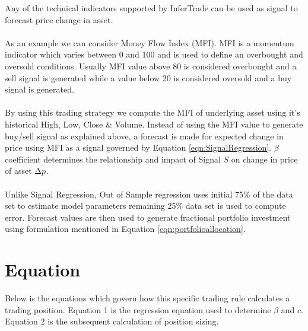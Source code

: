 \documentclass{article}
\begin{document}
\logo
{} %
\tblofcontents

\introtorule


\howtotrade
{Any of the technical indicators supported by InferTrade can be used as signal to forecast price change in asset. \\ \\ As an example we can consider Money Flow Index (MFI). MFI is a momentum indicator which varies between 0 and 100 and is used to define an overbought and oversold conditions. Usually MFI value above 80 is considered overbought and a sell signal is generated while a value below 20 is considered oversold and a buy signal is generated.\\ \\
By using this trading strategy we compute the MFI of underlying asset using it's historical High, Low, Close \& Volume. Instead of using the MFI value to generate buy/sell signal as explained above, a forecast is made for expected change in price using MFI as a signal governed by Equation \ref{eqn:SignalRegression}. $\beta$ coefficient determines the relationship and impact of Signal $S$ on change in price of asset $\Delta p$.\\ \\
Unlike Signal Regression, Out of Sample regression uses initial 75\% of the data set to estimate model parameters remaining 25\% data set is used to compute error. Forecast values are then used to generate fractional portfolio investment using formulation mentioned in Equation \ref{eqn:portfolioallocation}.
}

\outofsampleparameters

\section{Equation}
Below is the equations which govern how this specific trading rule calculates a trading position. Equation 1 is the regression equation used to determine $\beta$ and $c$. Equation 2 is the subsequent calculation of position sizing.
\end{document}
